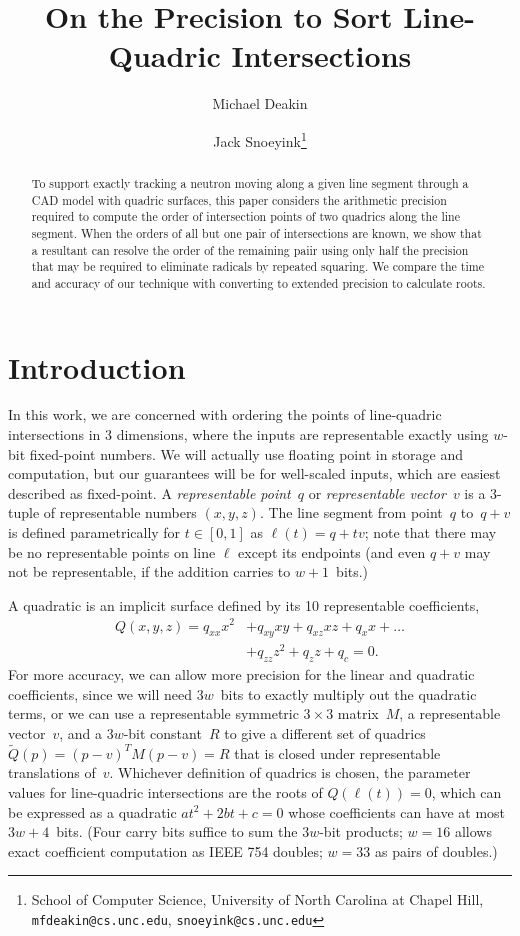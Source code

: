 \documentclass{cccg16}
\title{On the Precision to Sort Line-Quadric Intersections}
\author{Michael Deakin \and Jack Snoeyink\thanks{School of Computer
    Science, University of North Carolina at Chapel Hill, {\tt
      mfdeakin@cs.unc.edu}, {\tt snoeyink@cs.unc.edu}}}
\begin{document}
\thispagestyle{empty}
\maketitle

\begin{abstract}
  To support exactly tracking a neutron moving along a given line
  segment through a CAD model with quadric surfaces, this paper
  considers the arithmetic precision required to compute the order of
  intersection points of two quadrics along the line segment. When the
  orders of all but one pair of intersections are known, we show that a
  resultant can resolve the order of the remaining paiir using only
  half the precision that may be required to eliminate radicals by
  repeated squaring. We compare the time and accuracy of our technique
  with converting to extended precision to calculate roots.
\end{abstract}


\section{Introduction}
In this work, we are concerned with ordering the points of
line-quadric intersections in 3 dimensions, where the inputs are
representable exactly using $w$-bit fixed-point numbers.  We will
actually use floating point in storage and computation, but our
guarantees will be for well-scaled inputs, which are easiest described
as fixed-point.  A {\it representable point}~$q$ or {\it representable
  vector}~$v$ is a $3$-tuple of representable numbers $(x, y, z)$. The
line segment from point~$q$ to~$q+v$ is defined parametrically for
$t\in [0,1]$ as $\ell(t)=q+tv$; note that there may be no
representable points on line $\ell$ except its endpoints (and even
$q+v$ may not be representable, if the addition carries to
$w+1$~bits.)

A quadratic is an implicit surface defined by its 10 representable coefficients,
\begin{align*}Q(x, y, z)=q_{xx} x^2 &+ q_{xy} xy + q_{xz} xz + q_x x + \dots \\
&+ q_{zz} z^2 + q_{z} z + q_c = 0.
\end{align*}
For more accuracy, we can allow more precision for the linear and
quadratic coefficients, since we will need $3w$~bits to exactly
multiply out the quadratic terms, or we can use a representable
symmetric $3{\times} 3$ matrix~$M$, a representable vector~$v$, and a
$3w$-bit constant~$R$ to give a different set of quadrics $\tilde Q(p)
= (p-v)^TM(p-v) = R$ that is closed under representable translations
of~$v$. Whichever definition of quadrics is chosen, the parameter
values for line-quadric intersections are the roots of $Q(\ell(t))=0$,
which can be expressed as a quadratic $at^2+2bt+c=0$ whose
coefficients can have at most $3w+4$~bits.  (Four carry bits suffice
to sum the $3w$-bit products; $w=16$ allows exact coefficient
computation as IEEE 754 doubles; $w=33$ as pairs of doubles.)
\end{document}
